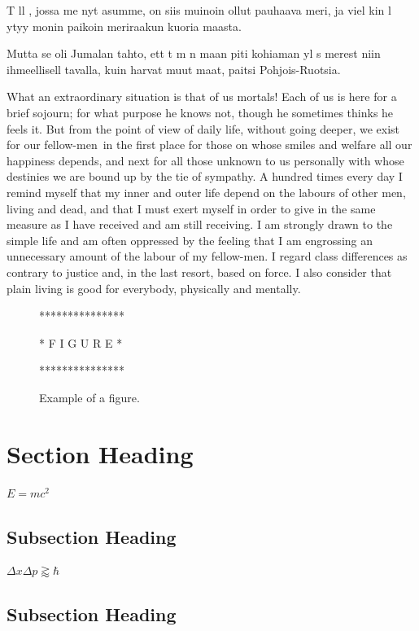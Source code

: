 \documentclass{article}
\begin{document}
\begin{quoting} 
T ll , jossa me nyt asumme, on siis muinoin ollut pauhaava
meri, ja viel kin l ytyy monin paikoin meriraakun kuoria maasta. 

Mutta se oli Jumalan tahto, ett  t m n maan piti kohiaman yl s merest  niin
ihmeellisell  tavalla, kuin harvat muut maat, paitsi Pohjois-Ruotsia.
\end{quoting}
What an extraordinary situation is that of us mortals! Each of us is here for a
brief sojourn; for what purpose he knows not, though he sometimes thinks he
feels it. But from the point of view of daily life, without going deeper, we
exist for our fellow-men~in the first place for those on whose smiles and
welfare all our happiness depends, and next for all those unknown to us
personally with whose destinies we are bound up by the tie of sympathy. A
hundred times every day I remind myself that my inner and outer life depend on
the labours of other men, living and dead, and that I must exert myself in
order to give in the same measure as I have received and am still receiving. I
am strongly drawn to the simple life and am often oppressed by the feeling that
I am engrossing an unnecessary amount of the labour of my fellow-men. I regard
class differences as contrary to justice and, in the last resort, based on
force. I also consider that plain living is good for everybody, physically and
mentally. 

\begin{figure}

***************

* F I G U R E *

***************

\caption{Example of a figure.}
\end{figure}

\section{Section Heading}
$E=mc^2$
\lipsum[5-6]

\cite{WikiBooks2008:LaTeX}
\subsection{Subsection Heading}
$\Delta x\Delta p \gtrapprox \hbar$
\lipsum[7-8]
\subsection{Subsection Heading}
\lipsum[9-10]
\end{document}
